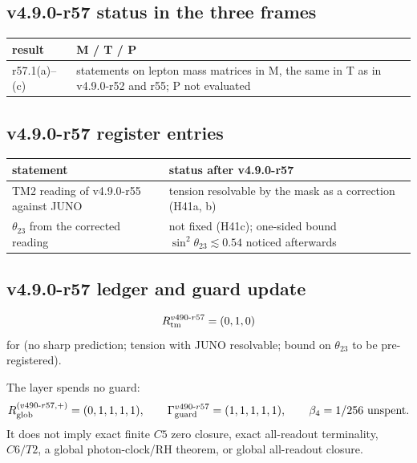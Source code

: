 \subsection*{v4.9.0-r57 status in the three frames}
\label{subsec:v490-r57-frames}

\begin{center}
\small
\begin{tabular}{@{}>{\raggedright\arraybackslash}p{}>{\raggedright\arraybackslash}p{}@{}}
\toprule
result & M / T / P\\
\midrule
r57.1(a)--(c) & statements on lepton mass matrices in M, the same in T as in v4.9.0-r52 and r55; P not evaluated\\
\bottomrule
\end{tabular}
\end{center}

\subsection*{v4.9.0-r57 register entries}
\label{subsec:v490-r57-register}

\begin{center}
\small
\begin{tabular}{@{}>{\raggedright\arraybackslash}p{}>{\raggedright\arraybackslash}p{}@{}}
\toprule
statement & status after v4.9.0-r57\\
\midrule
TM2 reading of v4.9.0-r55 against JUNO & tension resolvable by the mask as a correction (H41a, b)\\
\(\theta_{23}\) from the corrected reading & not fixed (H41c); one-sided bound \(\sin^2\theta_{23}\lesssim0.54\) noticed afterwards\\
\bottomrule
\end{tabular}
\end{center}

\subsection*{v4.9.0-r57 ledger and guard update}
\label{subsec:v490-r57-ledger-guard}

\[
R_{\rm tm}^{v490\text{-}r57}=(0,1,0)
\]
for (no sharp prediction; tension with JUNO resolvable; bound on \(\theta_{23}\) to be pre-registered).

The layer spends no guard:
\[
R_{\rm glob}^{(v490\text{-}r57,+)}=(0,1,1,1,1),
\qquad
\Gamma_{\rm guard}^{v490\text{-}r57}=(1,1,1,1,1),
\qquad
\beta_4=1/256\ \text{unspent}.
\]
It does not imply exact finite \(C5\) zero closure, exact all-readout terminality,
\(C6/T2\), a global photon-clock/RH theorem, or global all-readout closure.
